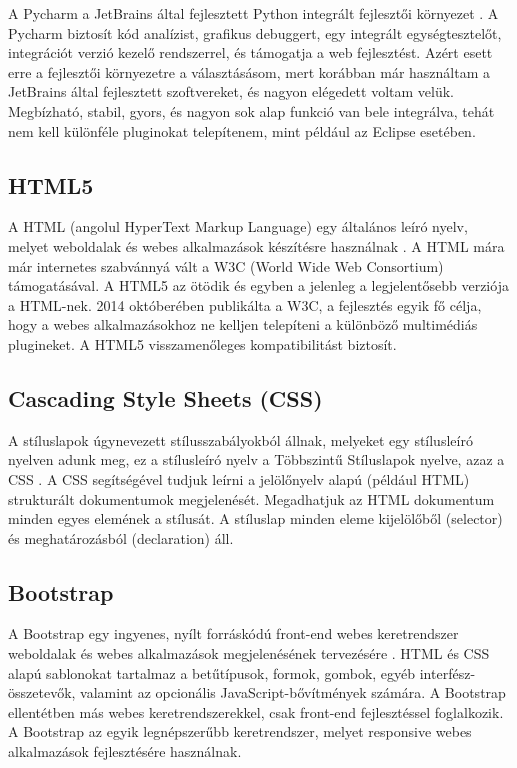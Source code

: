 A Pycharm a JetBrains által fejlesztett Python integrált fejlesztői környezet \cite{pycharm}. A Pycharm biztosít kód analízist, grafikus debuggert, egy integrált egységtesztelőt, integrációt verzió kezelő rendszerrel, és támogatja a web fejlesztést.
Azért esett erre a fejlesztői környezetre a választásásom, mert korábban már használtam a JetBrains által fejlesztett szoftvereket, és nagyon elégedett voltam velük. Megbízható, stabil, gyors, és nagyon sok alap funkció van bele integrálva, tehát nem kell különféle pluginokat telepítenem, mint például az Eclipse esetében.

\subsection{HTML5}

A HTML (angolul HyperText Markup Language) egy általános leíró nyelv, melyet weboldalak és webes alkalmazások készítésre használnak \cite{html}. A HTML mára már internetes szabvánnyá vált a W3C (World Wide Web Consortium) támogatásával.
A HTML5 az ötödik és egyben a jelenleg a legjelentősebb verziója a HTML-nek. 2014 októberében publikálta a W3C, a fejlesztés egyik fő célja, hogy a webes alkalmazásokhoz ne kelljen telepíteni a különböző multimédiás plugineket. A HTML5 visszamenőleges kompatibilitást biztosít.

\subsection{Cascading Style Sheets (CSS)}

A stíluslapok úgynevezett stílusszabályokból állnak, melyeket egy stílusleíró nyelven adunk meg, ez a stílusleíró nyelv a Többszintű Stíluslapok nyelve, azaz a CSS \cite{css}. A CSS segítségével tudjuk leírni a jelölőnyelv alapú (például HTML) strukturált dokumentumok megjelenését. Megadhatjuk az HTML dokumentum minden egyes elemének a stílusát. A stíluslap minden eleme kijelölőből (selector) és meghatározásból (declaration) áll.

\subsection{Bootstrap}

A Bootstrap egy ingyenes, nyílt forráskódú front-end webes keretrendszer weboldalak és webes alkalmazások megjelenésének tervezésére \cite{bootstrap}. HTML és CSS alapú sablonokat tartalmaz a betűtípusok, formok, gombok, egyéb interfész-összetevők, valamint az opcionális JavaScript-bővítmények számára. A Bootstrap ellentétben más webes keretrendszerekkel, csak front-end fejlesztéssel foglalkozik. A Bootstrap az egyik legnépszerűbb keretrendszer, melyet responsive webes alkalmazások fejlesztésére használnak.

